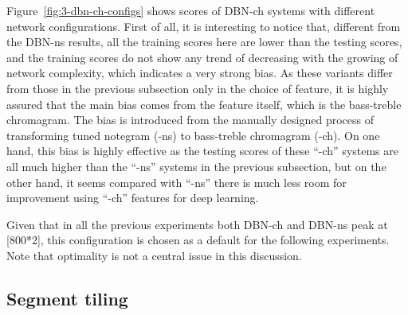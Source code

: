 Figure~\ref{fig:3-dbn-ch-configs} shows scores of DBN-ch systems with different network configurations. First of all, it is interesting to notice that, different from the DBN-ns results, all the training scores here are lower than the testing scores, and the training scores do not show any trend of decreasing with the growing of network complexity, which indicates a very strong bias. As these variants differ from those in the previous subsection only in the choice of feature, it is highly assured that the main bias comes from the feature itself, which is the bass-treble chromagram. The bias is introduced from the manually designed process of transforming tuned notegram (-ns) to bass-treble chromagram (-ch). On one hand, this bias is highly effective as the testing scores of these ``-ch'' systems are all much higher than the ``-ns'' systems in the previous subsection, but on the other hand, it seems compared with ``-ns'' there is much less room for improvement using ``-ch'' features for deep learning.

Given that in all the previous experiments both DBN-ch and DBN-ns peak at [800*2], this configuration is chosen as a default for the following experiments. Note that optimality is not a central issue in this discussion.

\subsection{Segment tiling} \label{sec:3-p3}

